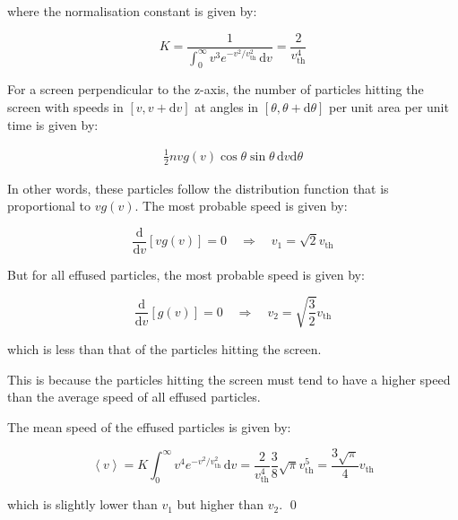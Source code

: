 \documentclass[12pt]{article}
\begin{document}
where the normalisation constant is given by:

\begin{equation}
    K = \frac{1}{\int_{0}^{\infty} v^{3} e^{-v^{2}/v_{\text{th}}^{2}} \, \mathrm{d}v} = \frac{2}{v_{\text{th}}^{4}}
\end{equation}

For a screen perpendicular to the z-axis, the number of particles hitting the screen with speeds in $[v, v + \mathrm{d}v]$ at angles in $[\theta, \theta + \mathrm{d}\theta]$ per unit area per unit time is given by:

\begin{equation}
\begin{split}
    \frac{1}{2} nv g(v) \cos{\theta} \sin{\theta} \, \mathrm{d}v \mathrm{d}\theta
\end{split}
\end{equation}

In other words, these particles follow the distribution function that is proportional to $v g(v)$. The most probable speed is given by:

\begin{equation}
    \frac{\mathrm{d}}{\mathrm{d}v} \left[ v g(v) \right] = 0 \quad \Rightarrow \quad v_{1} = \sqrt{2} v_{\text{th}}
\end{equation}

But for all effused particles, the most probable speed is given by:

\begin{equation}
    \frac{\mathrm{d}}{\mathrm{d}v} \left[ g(v) \right] = 0 \quad \Rightarrow \quad v_{2} = \sqrt{\frac{3}{2}} v_{\text{th}}
\end{equation}

which is less than that of the particles hitting the screen.

This is because the particles hitting the screen must tend to have a higher speed than the average speed of all effused particles.

The mean speed of the effused particles is given by:

\begin{equation}
    \left\langle v \right\rangle = K \int_{0}^{\infty} v^{4} e^{-v^{2}/v_{\text{th}}^{2}} \, \mathrm{d}v = \frac{2}{v_{\text{th}}^{4}} \frac{3}{8} \sqrt{\pi} v_{\text{th}}^{5} = \frac{3\sqrt{\pi}}{4} v_{\text{th}}
\end{equation}

which is slightly lower than $v_{1}$ but higher than $v_{2}$.
\qed
\end{document}
